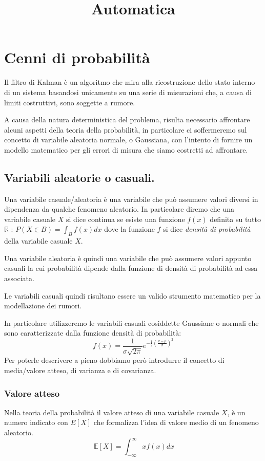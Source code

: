 \documentclass[12pt,a4paper]{article}
\title{Automatica}
\begin{document}
\section{Cenni di probabilità}

Il filtro di Kalman è un algoritmo che mira alla ricostruzione dello stato interno di un sistema basandosi unicamente su una serie di misurazioni che, a causa di limiti costruttivi, sono soggette a rumore.

A causa della natura deterministica del problema, risulta necessario affrontare alcuni aspetti della teoria della probabilità, in particolare ci soffermeremo sul concetto di variabile aleatoria normale, o Gaussiana, con l'intento di fornire un modello matematico per gli errori di misura che siamo costretti ad affrontare.

\subsection{Variabili aleatorie o casuali.}

Una variabile casuale/aleatoria è una variabile che può assumere valori diversi in dipendenza da qualche fenomeno aleatorio.
In particolare diremo che una variabile casuale $X$ si dice continua se esiste una funzione $f(x)$ definita su tutto $\mathbb{R}$ : $P(X \in B) = \int_B f(x) dx$ dove la funzione $f$ si dice \textit{densità di probabilità} della variabile casuale $X$.

Una variabile aleatoria è quindi una variabile che può assumere valori appunto casuali la cui probabilità dipende dalla funzione di densità di probabilità ad essa associata. 

Le variabili casuali quindi risultano essere un valido strumento matematico per la modellazione dei rumori.

In particolare utilizzeremo le variabili casuali cosiddette Gaussiane o normali che sono caratterizzate dalla funzione densità di probabilità: \[f(x) = \frac{1}{{\sigma \sqrt {2\pi } }}e^{-\frac{1}{2}{(\frac{x-\mu}{\sigma})}^2}\] Per poterle descrivere a pieno dobbiamo però introdurre il concetto di media/valore atteso, di varianza e di covarianza.

\subsubsection{Valore atteso}

Nella teoria della probabilità il valore atteso di una variabile casuale $X$, è un numero indicato con $E[X]$ che formalizza l'idea di valore medio di un fenomeno aleatorio.
\[\ {\mathbb  {E}}[X]=\int _{{-\infty }}^{{\infty }}xf(x)dx\]
\end{document}
